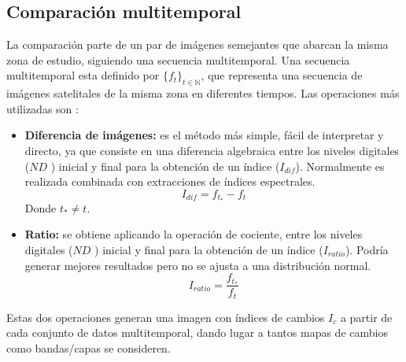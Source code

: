 \subsection{Comparaci\'on multitemporal}\label{subsec:compMult}
La comparaci\'on parte de un par de im\'agenes semejantes que abarcan la misma zona de estudio, siguiendo una secuencia multitemporal. Una secuencia multitemporal esta definido por $ \{f_{t}\}_{t \in \mathbb{N}} $, que representa una secuencia de im\'agenes satelitales de la misma zona en diferentes tiempos. Las operaciones m\'as utilizadas son \cite{chuvieco1998factor}: 
	\begin{itemize}
		\item \textbf{Diferencia de im\'agenes:} es el m\'etodo m\'as simple, f\'acil de interpretar y directo, ya que consiste en una diferencia algebraica entre los niveles digitales ($ ND $ ) inicial y final para la obtenci\'on de un \'indice ($ I_{dif} $). Normalmente es realizada combinada  con extracciones de \'indices espectrales.
								\begin{equation}
								I_{dif} = f_{t_{*}}-f_{t}
								\end{equation} 	
		Donde $ t_{*} \neq t $.
				\item \textbf{Ratio:} se obtiene aplicando la operación de cociente, entre los niveles digitales ($ ND $ ) inicial y final para la obtenci\'on de un \'indice ($ I_{ratio} $). Podr\'ia  generar mejores resultados pero no se ajusta a una distribución normal.
										\begin{equation}
										I_{ratio} = \dfrac{f_{t_{*}}}{f_{t}}
										\end{equation} 	

		\end{itemize}
Estas dos operaciones generan una imagen con \'indices de cambios $ I_{c} $ a partir de cada conjunto de datos multitemporal, dando lugar a tantos mapas de cambios como bandas/capas se consideren.
